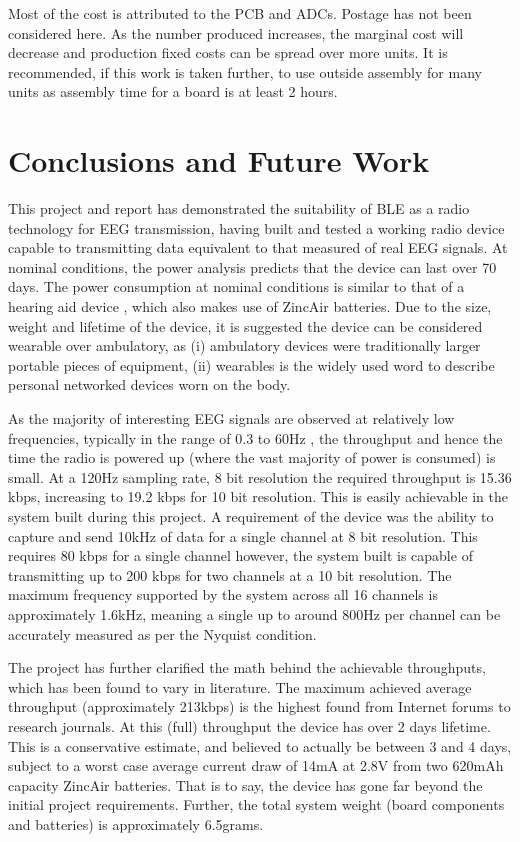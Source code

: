 \documentclass[]{article}
\begin{document}
Most of the cost is attributed to the \ac{PCB} and \ac{ADC}s. Postage has not been considered here. As the number produced increases, the marginal cost will decrease and production fixed costs can be spread over more units. It is recommended, if this work is taken further, to use outside assembly for many units as assembly time for a board is at least 2 hours.

\clearpage 
\section{Conclusions and Future Work}

This project and report has demonstrated the suitability of \ac{BLE} as a radio technology for \ac{EEG} transmission, having built and tested a working radio device capable to transmitting data equivalent to that measured of real \ac{EEG} signals. At nominal conditions, the power analysis predicts that the device can last over 70 days. The power consumption at nominal conditions is similar to that of a hearing aid device \cite{hearaid}, which also makes use of ZincAir batteries. Due to the size, weight and lifetime of the device, it is suggested the device can be considered wearable over ambulatory, as (i) ambulatory devices were traditionally larger portable pieces of equipment, (ii) wearables is the widely used word to describe personal networked devices worn on the body. 

As the majority of interesting \ac{EEG} signals are observed at relatively low frequencies, typically in the range of 0.3 to 60Hz \cite{eeeman}, the throughput and hence the time the radio is powered up (where the vast majority of power is consumed) is small. At a 120Hz sampling rate, 8 bit resolution the required throughput is 15.36 kbps, increasing to 19.2 kbps for 10 bit resolution. This is easily achievable in the system built during this project. A requirement of the device was the ability to capture and send 10kHz of data for a single channel at 8 bit resolution. This requires 80 kbps for a single channel however, the system built is capable of transmitting up to 200 kbps for two channels at a 10 bit resolution. The maximum frequency supported by the system across all 16 channels is approximately 1.6kHz, meaning a single up to around 800Hz per channel can be accurately measured as per the Nyquist condition. 

The project has further clarified the math behind the achievable throughputs, which has been found to vary in literature. The maximum achieved average throughput (approximately 213kbps) is the highest found from Internet forums to research journals. At this (full) throughput the device has over 2 days lifetime. This is a conservative estimate, and believed to actually be between 3 and 4 days, subject to a worst case average current draw of 14mA at 2.8V from two 620mAh capacity ZincAir batteries. That is to say, the device has gone far beyond the initial project requirements. Further, the total system weight (board components and batteries) is approximately 6.5grams.
\end{document}
